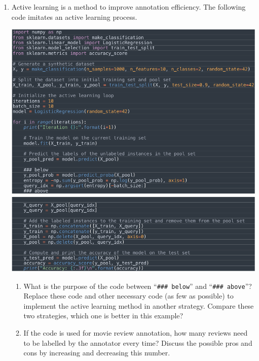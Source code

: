 \documentclass[conference]{IEEEtran}
\begin{document}
\begin{enumerate}
\newpage
\item Active learning is a method to improve annotation efficiency. The following code imitates an active learning process.
\begin{center}
\includegraphics[scale=0.5]{HW 02 code (1).png}
\includegraphics[scale=0.5]{HW 02 code (2).png}
\end{center}
\begin{enumerate}
\item What is the purpose of the code between “\verb"### below"” and “\verb"### above"”? Replace these code and other necessary code (as few as possible) to implement the active learning method in another strategy. Compare these two strategies, which one is better in this example?\\

\item If the code is used for movie review annotation, how many reviews need to be labelled by the annotator every time? Discuss the possible pros and cons by increasing and decreasing this number.\\

\end{enumerate}
\end{enumerate}
\end{document}

